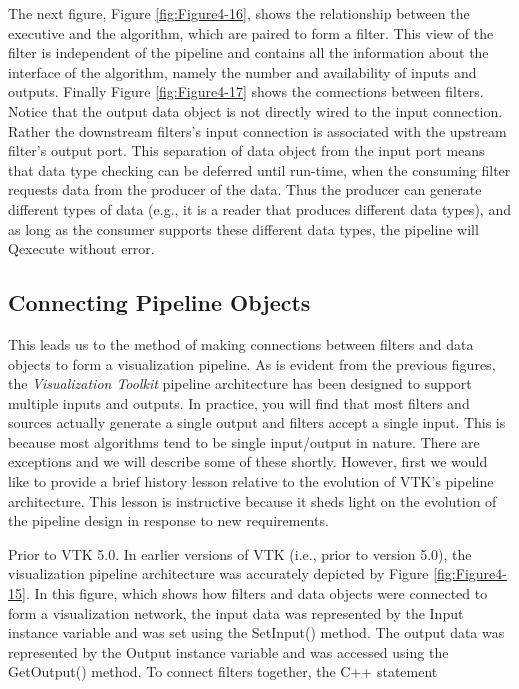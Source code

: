 The next figure, Figure \ref{fig:Figure4-16}, shows the relationship between the executive and the algorithm, which are paired to form a filter. This view of the filter is independent of the pipeline and contains all the information about the interface of the algorithm, namely the number and availability of inputs and outputs. Finally Figure \ref{fig:Figure4-17} shows the connections between filters. Notice that the output data object is not directly wired to the input connection. Rather the downstream filters's input connection is associated with the upstream filter's output port. This separation of data object from the input port means that data type checking can be deferred until run-time, when the consuming filter requests data from the producer of the data. Thus the producer can generate different types of data (e.g., it is a reader that produces different data types), and as long as the consumer supports these different data types, the pipeline will Qexecute without error.

\subsection{Connecting Pipeline Objects}
\label{subsec:connecting_pipeline_objects}

This leads us to the method of making connections between filters and data objects to form a visualization pipeline. As is evident from the previous figures, the \emph{Visualization Toolkit} pipeline architecture has been designed to support multiple inputs and outputs. In practice, you will find that most filters and sources actually generate a single output and filters accept a single input. This is because most algorithms tend to be single input/output in nature. There are exceptions and we will describe some of these shortly. However, first we would like to provide a brief history lesson relative to the evolution of VTK's pipeline architecture. This lesson is instructive because it sheds light on the evolution of the pipeline design in response to new requirements.

Prior to VTK 5.0. In earlier versions of VTK (i.e., prior to version 5.0), the visualization pipeline architecture was accurately depicted by Figure \ref{fig:Figure4-15}. In this figure, which shows how filters and data objects were connected to form a visualization network, the input data was represented by the Input instance variable and was set using the SetInput() method. The output data was represented by the Output instance variable and was accessed using the GetOutput() method. To connect filters together, the C++ statement

